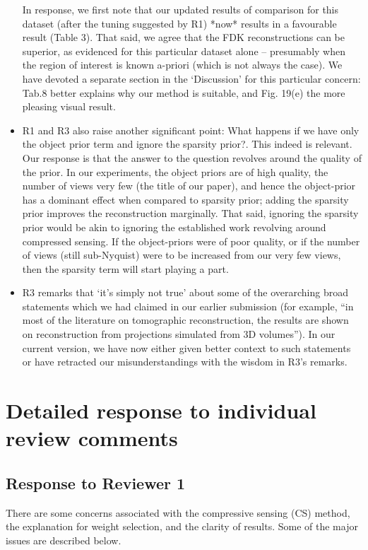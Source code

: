 \documentclass{article}
\begin{document}
\begin{itemize}
In response, we first note that our updated results of comparison for this dataset (after the tuning suggested by R1) *now* results in a favourable result (Table 3).  That said, we agree that the FDK reconstructions can be superior, as evidenced for this particular dataset alone -- presumably when the region of interest is known a-priori (which is not always the case). We have devoted a separate section in the `Discussion' for this particular concern: Tab.8 better explains why our method is suitable, and Fig. 19(e) the more pleasing visual result.  
\item R1 and R3 also raise another significant point:  What happens if we have only the object prior term and ignore the sparsity prior?.  This indeed is relevant. Our response is that the answer to the question revolves around the quality of the prior. In our experiments, the object priors are of high quality, the number of views very few (the title of our paper), and hence the object-prior has a dominant effect when compared to sparsity prior;  adding the sparsity prior improves the reconstruction marginally.  That said, ignoring the sparsity prior would be akin to ignoring the established work revolving around compressed sensing.  If the object-priors were of poor quality, or if the number of views (still sub-Nyquist) were to be increased from our very few views, then the sparsity term will start playing a part.  
\item R3 remarks that `it's simply not true' about some of the overarching broad statements which we had claimed in our earlier submission (for example, ``in most of the literature on tomographic reconstruction, the results are shown on reconstruction from projections simulated from 3D volumes''). In our current version, we have now either given better context to such statements or have retracted our misunderstandings with the wisdom in R3's remarks.
\end{itemize}

\section{ Detailed response to individual review comments}

\subsection{Response to Reviewer 1}
There are some concerns associated with the compressive sensing (CS) method, the explanation for weight selection, and the clarity of results. Some of the major issues are described below. 
\end{document}
